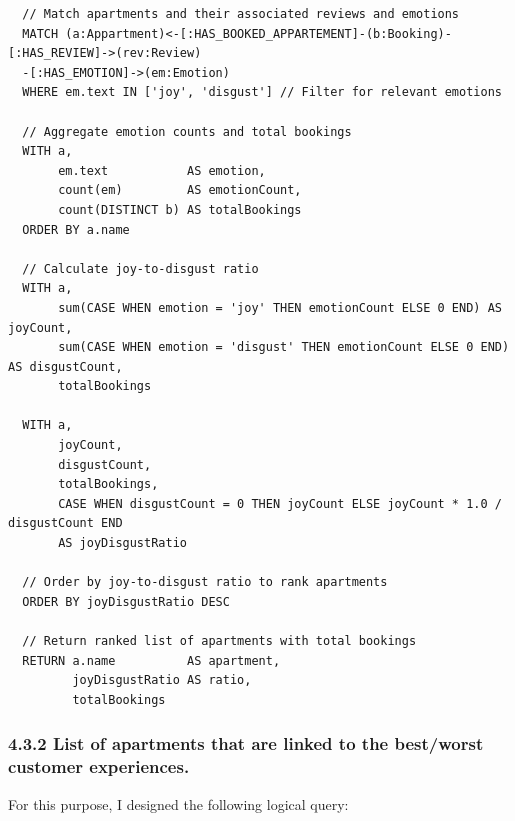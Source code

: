 \documentclass[
]{article}
\begin{document}
  
  \begin{lstlisting}
  // Match apartments and their associated reviews and emotions
  MATCH (a:Appartment)<-[:HAS_BOOKED_APPARTEMENT]-(b:Booking)-[:HAS_REVIEW]->(rev:Review)
  -[:HAS_EMOTION]->(em:Emotion)
  WHERE em.text IN ['joy', 'disgust'] // Filter for relevant emotions
  
  // Aggregate emotion counts and total bookings 
  WITH a, 
       em.text           AS emotion, 
       count(em)         AS emotionCount, 
       count(DISTINCT b) AS totalBookings
  ORDER BY a.name
  
  // Calculate joy-to-disgust ratio
  WITH a, 
       sum(CASE WHEN emotion = 'joy' THEN emotionCount ELSE 0 END) AS joyCount,
       sum(CASE WHEN emotion = 'disgust' THEN emotionCount ELSE 0 END) AS disgustCount,
       totalBookings
  
  WITH a, 
       joyCount,
       disgustCount, 
       totalBookings,
       CASE WHEN disgustCount = 0 THEN joyCount ELSE joyCount * 1.0 / disgustCount END 
       AS joyDisgustRatio
  
  // Order by joy-to-disgust ratio to rank apartments
  ORDER BY joyDisgustRatio DESC
  
  // Return ranked list of apartments with total bookings
  RETURN a.name          AS apartment, 
         joyDisgustRatio AS ratio, 
         totalBookings
  \end{lstlisting}

\subsubsection{4.3.2 List of apartments that are linked to the
best/worst customer
experiences.}\label{list-of-apartments-that-are-linked-to-the-bestworst-customer-experiences.}

For this purpose, I designed the following logical query:

\vspace*{10mm}
\end{document}
